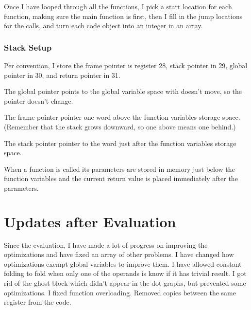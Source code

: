 Once I have looped through all the functions, I pick a start location for each function, making sure the main function is first, then I fill in the jump locations for the calls, and turn each code object into an integer in an array. 

\subsubsection*{Stack Setup}

Per convention, I store the frame pointer is register 28, stack pointer in 29, global pointer in 30, and return pointer in 31. 

The global pointer points to the global variable space with doesn't move, so the pointer doesn't change. 

The frame pointer pointer one word above the function variables storage space. (Remember that the stack grows downward, so one above means one behind.)

The stack pointer pointer to the word just after the function variables storage space. 

When a function is called its parameters are stored in memory just below the function variables and the current return value is placed immediately after the parameters. 


\newpage
\section*{Updates after Evaluation}
Since the evaluation, I have made a lot of progress on improving the optimizations and have fixed an array of other problems. 
I have changed how optimizations exempt global variables to improve them. 
I have allowed constant folding to fold when only one of the operands is know if it has trivial result. 
I got rid of the ghost block which didn't appear in the dot graphs, but prevented some optimizations. 
I fixed function overloading. 
Removed copies between the same register from the code. 